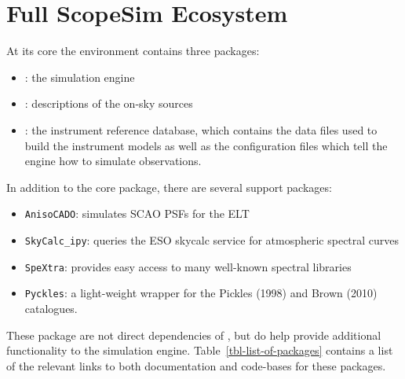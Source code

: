 

\section{Full ScopeSim Ecosystem}
\label{full-scopesim-ecosystem}

At its core the \ScopeSim{} environment contains three packages:

\begin{itemize}
\item \ScopeSim{}: the simulation engine

\item \ScopeSimtemplates: descriptions of the on-sky sources

\item \IRDB{}: the instrument reference database, which contains the data files used to build the instrument models as well as the configuration files which tell the \ScopeSim{} engine how to simulate observations.
\end{itemize}

In addition to the core package, there are several support packages:

\begin{itemize}
\item \lstinline{AnisoCADO}: simulates SCAO PSFs for the ELT

\item \lstinline{SkyCalc_ipy}: queries the ESO skycalc service for atmospheric spectral curves

\item \lstinline{SpeXtra}: provides easy access to many well-known spectral libraries

\item \lstinline{Pyckles}: a light-weight wrapper for the Pickles (1998) and Brown (2010) catalogues.
\end{itemize}

These package are not direct dependencies of \ScopeSim{}, but do help provide additional functionality to the simulation engine.
Table~\ref{tbl-list-of-packages} contains a list of the relevant links to both documentation and code-bases for these packages.

